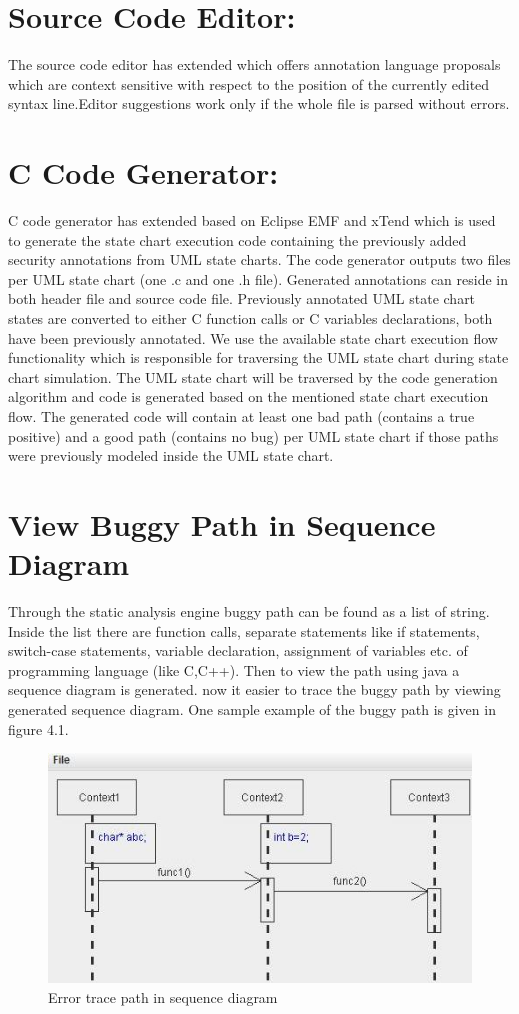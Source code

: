 \section{Source Code Editor:}
The source code editor has extended which offers annotation language proposals which are context sensitive with respect to the position of the currently edited syntax line.Editor suggestions work only if the whole file is parsed without errors.

\section{C Code Generator:}
C code generator has extended based on Eclipse EMF and xTend which is used to generate the state chart execution code containing the previously added security annotations from UML state charts. The code generator outputs two files per UML state chart (one .c and one
.h file). Generated annotations can reside in both header file
and source code file. Previously annotated UML state chart
states are converted to either C function calls or C variables
declarations, both have been previously annotated. We use
the available state chart execution flow functionality which is
responsible for traversing the UML state chart during state
chart simulation. The UML state chart will be traversed by the code generation algorithm and code is generated based on
the mentioned state chart execution flow. The generated code
will contain at least one bad path (contains a true positive) and
a good path (contains no bug) per UML state chart if those
paths were previously modeled inside the UML state chart.

\section{View Buggy Path in Sequence Diagram}
Through the static analysis engine buggy path can be found as a list of string. Inside the list there are function calls, separate statements like if statements, switch-case statements, variable declaration, assignment of variables etc. of programming language (like C,C++). Then to view the path using java a sequence diagram is generated.
now it easier to trace the buggy path by viewing generated sequence diagram. One sample example of the buggy path is given in figure 4.1.
\begin{figure}[htbp]
	\centering
	\includegraphics{styles/Error_trace_path.jpg}
	\caption{Error trace path in sequence diagram}
\end{figure}
